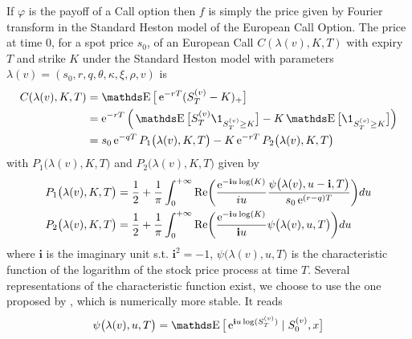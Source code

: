 \begin{example}[Call]
	If $\varphi$ is the payoff of a Call option then $f$ is simply the price given by Fourier transform in the Standard Heston model of the European Call Option. The price at time $0$, for a spot price $s_0$, of an European Call $C(\lambda(v), K, T)$ with expiry $T$ and strike $K$ under the Standard Heston model with parameters $\lambda(v) = (s_0, r, q, \theta, \kappa, \xi, \rho, v)$ is
	\begin{equation}\label{RH:price_call_heston}
		\begin{aligned}
			C(\lambda(v), K, T)
			 & = \E \big[ \e^{-r T} (S_T^{(v)} - K)_+ \big]                                                                    \\
			 & = \e^{-r T} \Big( \E \big[ S_T^{(v)} \1_{S_T^{(v)} \geq K} \big] - K \E \big[ \1_{S_T^{(v)} \geq K} \big] \Big) \\
			 & = s_0 \e^{-q T} P_1 \big( \lambda(v), K, T \big) - K \e^{-r T} P_2 \big(\lambda(v), K, T \big)
		\end{aligned}
	\end{equation}
	with $P_1 \big( \lambda(v), K, T \big)$ and $P_2 \big( \lambda(v), K, T \big)$ given by
	\begin{equation}
		\begin{aligned}
			P_1 \big( \lambda(v), K, T \big)
			 & = \frac{1}{2} + \frac{1}{\pi} \int_{0}^{+ \infty} \textrm{Re} \bigg( \frac{ \operatorname{e}^{-\textbf{i} u \log (K)} }{ iu } \frac{ \psi \big(\lambda(v), u - \textbf{i}, T \big) }{ s_0 \operatorname{e}^{ (r-q)T } } \bigg) du \\
			P_2 \big( \lambda(v), K, T \big)
			 & = \frac{1}{2} + \frac{1}{\pi} \int_{0}^{+ \infty} \textrm{Re} \bigg( \frac{ \operatorname{e}^{-\textbf{i} u \log (K)} }{ \textbf{i} u } \psi \big( \lambda(v), u, T \big) \bigg) du                                 \\
		\end{aligned}
	\end{equation}
	where $\textbf{i}$ is the imaginary unit s.t. $\textbf{i}^2 = -1$, $\psi \big( \lambda(v), u, T \big)$ is the characteristic function of the logarithm of the stock price process at time $T$. Several representations of the characteristic function exist, we choose to use the one proposed by \cite{SchoutensWim2004, gatheral2011volatility, littletrapheston}, which is numerically more stable. It reads
	\begin{equation}
		\begin{aligned}
			\psi \big( \lambda(v), u, T \big)
			 & = \E \big[ \e^{ \textbf{i} u \log(S_T^{(v)}) } \mid S_0^{(v)}, x \big]                                                            \\

\end{aligned}
\end{equation}
\end{example}
